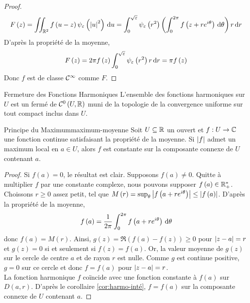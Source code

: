 \documentclass{cours}
\begin{document}
\begin{proof}
	\begin{equation*}
		F\left(z\right) = \iint_{\mathbb{R}^{2}} f\left(u - z\right) \psi_{\varepsilon}\left(\left|u\right|^{2}\right){\rm \, d} u = \int_{0}^{\sqrt{\varepsilon}} \psi_{\varepsilon}\left(r^{2}\right) \left(\int_{0}^{2\pi} f\left(z + re^{i\theta}\right) {\rm \, d} \theta\right)r {\rm \, d} r
	\end{equation*}
	D'après la propriété de la moyenne, 
	\begin{equation*}
		F\left(z\right) = 2\pi f\left(z\right) \int_{0}^{\sqrt{\varepsilon}} \psi_{\varepsilon}\left(r^{2}\right) r {\rm \, d} r = \pi f\left(z\right)
	\end{equation*}
	Donc $f$ est de classe $\mathcal{C}^{\infty}$ comme $F$. 
\end{proof}

\begin{corollaire}
	{Fermeture des Fonctions Harmoniques}{}
	L'ensemble des fonctions harmoniques sur $U$ est un fermé de $\mathcal{C}^{0}\left(U, \mathbb{R}\right)$ muni de la topologie de la convergence uniforme sur tout compact inclus dans $U$. 
\end{corollaire}

\begin{théorème}
	{Principe du Maximum}{maximum-moyenne}
	Soit $U \subseteq \mathbb{R}$ un ouvert et $f : U \to \mathbb{C}$ une fonction continue satisfaisant la propriété de la moyenne. 
	Si $\left|f\right|$ admet un maximum local en $a \in U$, alors $f$ est constante sur la composante connexe de $U$ contenant $a$. 
\end{théorème}
\begin{proof}
	Si $f\left(a\right) = 0$, le résultat est clair. Supposons $f\left(a\right) \neq 0$. Quitte à multiplier $f$ par une constante complexe, nous pouvons supposer $f\left(a\right) \in \mathbb{R}_{+}^{*}$. Choissons $r \geq 0$ assez petit, tel que $M\left(r\right) = \sup_{\theta}\left|f\left(a + re^{i\theta}\right)\right| \leq \left|f\left(a\right)\right|$.
	D'après la propriété de la moyenne, 
	\begin{equation*}
		f\left(a\right) = \frac{1}{2\pi}\int_{0}^{2\pi}f\left(a + re^{i\theta}\right){\rm \, d} \theta
	\end{equation*}
	donc $f\left(a\right) = M\left(r\right)$. Ainsi, $g\left(z\right) = \Re\left(f\left(a\right) - f\left(z\right)\right)\geq 0$ pour $\left|z - a\right| = r$ et $g\left(z\right) = 0$ si et seulement si $f\left(z\right) = f\left(a\right)$. 
	Or, la valeur moyenne de $g\left(z\right)$ sur le cercle de centre $a$ et de rayon $r$ est nulle. Comme $g$ est continue positive, $g = 0$ sur ce cercle et donc $f = f\left(a\right)$ pour $\left|z - a\right| = r$. \\
	La fonction harmonique $f$ coïncide avec une fonction constante à $f\left(a\right)$ sur $D\left(a, r\right)$. D'après le corollaire \ref{cor:harmo-inté}, $f = f\left(a\right)$ sur la composante connexe de $U$ contenant $a$. 
\end{proof}
\end{document}
